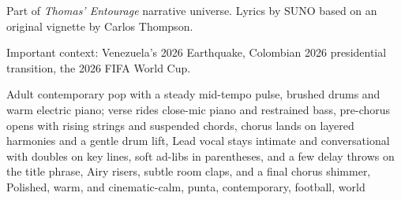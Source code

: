 
\begin{notes}
Part of \emph{Thomas’ Entourage} narrative universe. Lyrics by SUNO based on an original vignette by Carlos Thompson.

Important context: Venezuela's 2026 Earthquake, Colombian 2026 presidential transition, the 2026 FIFA World Cup.
\end{notes}
\begin{style}
Adult contemporary pop with a steady mid-tempo pulse, brushed drums and warm electric piano; verse rides close-mic piano and restrained bass, pre-chorus opens with rising strings and suspended chords, chorus lands on layered harmonies and a gentle drum lift, Lead vocal stays intimate and conversational with doubles on key lines, soft ad-libs in parentheses, and a few delay throws on the title phrase, Airy risers, subtle room claps, and a final chorus shimmer, Polished, warm, and cinematic-calm, punta, contemporary, football, world
\end{style}
